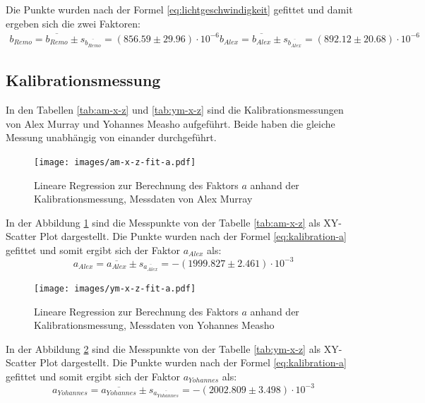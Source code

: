 Die Punkte wurden nach der Formel \ref{eq:lichtgeschwindigkeit} gefittet und damit ergeben sich  die zwei  Faktoren:
\begin{align}
    b_{Remo} = \overline{b_{Remo}} \pm s_{\overline{b_{Remo}}} = (856.59 \pm 29.96)\cdot 10^{-6}
    b_{Alex} = \overline{b_{Alex}} \pm s_{\overline{b_{Alex}}} = (892.12 \pm 20.68)\cdot 10^{-6}
\end{align}


\subsection{Kalibrationsmessung}

In    den   Tabellen   \ref{tab:am-x-z}   und    \ref{tab:ym-x-z}    sind    die
Kalibrationsmessungen von Alex Murray  und  Yohannes  Measho aufgef\"uhrt. Beide
haben   die   gleiche   Messung   unabh\"angig  von   einander   durchgef\"uhrt.

\begin{figure}[H]
    \center
    \texttt{[image: images/am-x-z-fit-a.pdf]}
    \caption{Lineare Regression zur Berechnung des Faktors $a$ anhand der Kalibrationsmessung, Messdaten von Alex Murray}
    \label{fig:am-x-z-fit-a}
\end{figure}

In der Abbildung \ref{fig:am-x-z-fit-a}  sind  die  Messpunkte  von  der Tabelle
\ref{tab:am-x-z} als XY-Scatter Plot dargestellt.  Die  Punkte  wurden  nach der
Formel  \ref{eq:kalibration-a}   gefittet  und  somit  ergibt  sich  der  Faktor
$a_{Alex}$ als:
\begin{equation}
    a_{Alex} = \overline{a_{Alex}} \pm s_{\overline{a_{Alex}}} = -(1999.827 \pm 2.461)\cdot 10^{-3}
    \label{eq:am-a}
\end{equation}

\begin{figure}[H]
    \center
    \texttt{[image: images/ym-x-z-fit-a.pdf]}
    \caption{Lineare Regression zur Berechnung des Faktors $a$ anhand der Kalibrationsmessung, Messdaten von Yohannes Measho}
    \label{fig:ym-x-z-fit-a}
\end{figure}

In  der  Abbildung \ref{fig:ym-x-z-fit-a} sind die Messpunkte  von  der  Tabelle
\ref{tab:ym-x-z} als XY-Scatter Plot dargestellt. Die  Punkte  wurden  nach  der
Formel  \ref{eq:kalibration-a}   gefittet  und  somit  ergibt  sich  der  Faktor
$a_{Yohannes}$ als:
\begin{equation}
    a_{Yohannes} = \overline{a_{Yohannes}} \pm s_{\overline{a_{Yohannes}}} = -(2002.809 \pm 3.498)\cdot 10^{-3}
    \label{eq:ym-a}
\end{equation}
